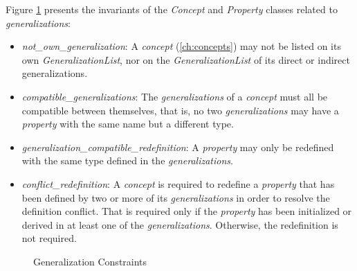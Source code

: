 Figure \ref{fig:ocl:generalization} presents the invariants
of the \emph{Concept} and \emph{Property} classes
related to \emph{generalizations}:

\begin{itemize}

\item \emph{not\_own\_generalization}:
A \emph{concept} (\ref{ch:concepts}) may not be listed on its own \emph{GeneralizationList},
nor on the \emph{GeneralizationList} of its direct or indirect generalizations.

\item \emph{compatible\_generalizations}:
The \emph{generalizations} of a \emph{concept} must all be compatible between themselves,
that is, no two \emph{generalizations} may have a \emph{property} with the same name
but a different type.

\item \emph{generalization\_compatible\_redefinition}:
A \emph{property} may only be redefined with the same type defined in the \emph{generalizations}.

\item \emph{conflict\_redefinition}:
A \emph{concept} is required to redefine a \emph{property} that
has been defined by two or more of its \emph{generalizations}
in order to resolve the definition conflict.
That is required only if the \emph{property} has been initialized or derived
in at least one of the \emph{generalizations}.
Otherwise, the redefinition is not required.

\end{itemize}

\begin{figure}

\caption{Generalization Constraints}
\label{fig:ocl:generalization}
\end{figure}
